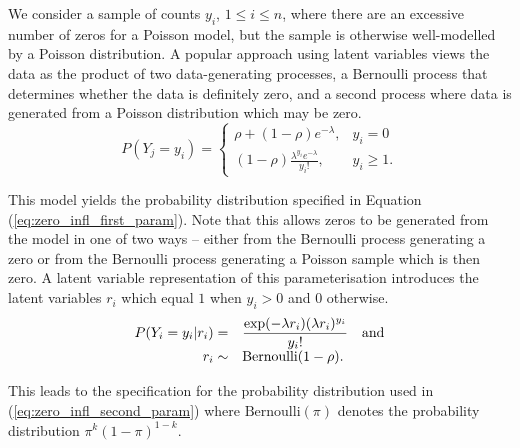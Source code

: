 We consider a sample of counts $y_i$, $1 \le i\le n$, where there are an
excessive number of zeros for a Poisson model, but the sample is otherwise
well-modelled by a Poisson distribution. A popular approach using latent
variables views the data as the product of two data-generating processes, a
Bernoulli process that determines whether the data is definitely zero, and a
second process where data is generated from a Poisson distribution which may be
zero.
\begin{equation}
\label{eq:zero_infl_first_param}
	P(Y_j = y_i) = \left\{ \begin{array}{ll}
        \rho + (1 - \rho) e^{-\lambda},  & y_i = 0 \\
	    (1 - \rho) \frac{\lambda^{y_i} e^{-\lambda}} {y_i!},  &y_i \ge 1.
	\end{array} \right.
\end{equation}

This model yields the probability distribution specified in Equation
(\ref{eq:zero_infl_first_param}). Note that this allows zeros to be generated
from the model in one of two ways -- either from the Bernoulli process
generating a zero or from the Bernoulli process generating a Poisson sample
which is then zero. A latent variable representation of this parameterisation
introduces the latent variables $r_i$ which equal $1$ when $y_i>0$ and $0$
otherwise. 
\begin{equation}
\label{eq:zero_infl_second_param}
\begin{array}{rl}
	P(Y_i=y_i|r_i) = & \displaystyle  \frac{\exp(-\lambda r_i)(\lambda r_i)^{y_i}}{y_i!} \quad \mbox{and} \\
	r_i \sim & \mbox{Bernoulli}(1-\rho).
\end{array}
\end{equation}

\noindent This leads to the specification for the probability distribution used
in  (\ref{eq:zero_infl_second_param}) where $\text{Bernoulli}(\pi)$
denotes the probability distribution $\pi^k (1 - \pi)^{1-k}$.

